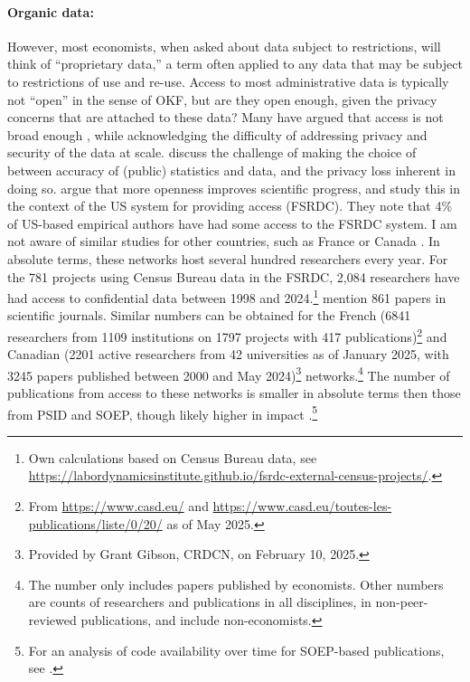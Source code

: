 \documentclass{Revue-economique}
\newcommand{\citep}{\parencite}
\newcommand{\citet}{\textcite}
\begin{document}
\begin{Article} [%
	Titre={Reproducibility and Open Science in Economics},
	Auteur={Lars Vilhuber\thanks{Cornell University, lars.vilhuber@cornell.edu}}]
\begin{refsection}[Main]
\paragraph{Organic data:} However, most economists, when asked about data subject to restrictions, will think of ``proprietary data,'' a term often applied to any data that may be subject to restrictions of use and re-use. Access to most administrative data is typically not ``open'' in the sense of OKF, but are they open enough, given the privacy concerns that are attached to these data? Many have argued that access is not broad enough \citep{card_expanding_2010,einav_economics_2014}, while acknowledging the difficulty of addressing privacy and security of the data at scale. \citet{abowd_economic_2018} discuss the challenge of making the choice of between accuracy of (public) statistics and data, and the privacy loss inherent in doing so. \citet{nagaraj_improving_2020} argue that more openness improves scientific progress, and \citet{nagaraj_how_2023} study this in the context of the US system for providing access (\ac{FSRDC}). They note that 4\% of US-based empirical authors have had some access to the FSRDC system. I am not aware of similar studies for other countries, such as France \citep[the equivalent system is the \ac{CASD}, ][]{gadouche_centre_2019} or Canada \citep{currie2015social}. In absolute terms, these networks host several hundred researchers every year. For the 781 projects using Census Bureau data in the \ac{FSRDC}, 2,084 researchers  have had access to confidential data between 1998 and 2024.\footnote{Own calculations based on Census Bureau data, see \url{https://labordynamicsinstitute.github.io/fsrdc-external-census-projects/}.} \citet{nagaraj_how_2023} mention 861 papers in scientific journals. Similar numbers can be obtained for the French (6841 researchers from 1109 institutions on 1797 projects with 417 publications)\footnote{From \url{https://www.casd.eu/} and \url{https://www.casd.eu/toutes-les-publications/liste/0/20/} as of May 2025.}
and Canadian (2201 active researchers from 42 universities as of January 2025, with 3245 papers published between 2000 and May 2024)\footnote{Provided by Grant Gibson, CRDCN, on February 10, 2025.} networks.\footnote{The \citet{nagaraj_how_2023} number only includes papers published by economists. Other numbers are counts of researchers and publications in all disciplines, in non-peer-reviewed publications, and include non-economists.} The number of publications from access to these networks is smaller in absolute terms then those from PSID and SOEP, though likely higher in impact \citep{nagaraj_how_2023}.\footnote{For an analysis of code availability over time for SOEP-based publications, see \citet{fink_replication_2025}.}


\end{refsection}
\end{Article}
\end{document}
